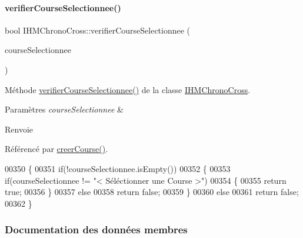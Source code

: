 \paragraph{\texorpdfstring{verifier\+Course\+Selectionnee()}{verifierCourseSelectionnee()}}
{\footnotesize\ttfamily bool I\+H\+M\+Chrono\+Cross\+::verifier\+Course\+Selectionnee (\begin{DoxyParamCaption}\item[{Q\+String}]{course\+Selectionnee }\end{DoxyParamCaption})\hspace{0.3cm}{\ttfamily [private]}}



Méthode \hyperlink{class_i_h_m_chrono_cross_afa7d1fb0245bb3e8bbffdf2687b02248}{verifier\+Course\+Selectionnee()} de la classe \hyperlink{class_i_h_m_chrono_cross}{I\+H\+M\+Chrono\+Cross}. 


\begin{DoxyParams}{Paramètres}
{\em course\+Selectionnee} & \\
\hline
\end{DoxyParams}
\begin{DoxyReturn}{Renvoie}

\end{DoxyReturn}


Référencé par \hyperlink{class_i_h_m_chrono_cross_a3fc01e539c59645e0655e56e440f4b83}{creer\+Course()}.


\begin{DoxyCode}
00350 \{
00351     \textcolor{keywordflow}{if}(!courseSelectionnee.isEmpty())
00352     \{
00353         \textcolor{keywordflow}{if}(courseSelectionnee != \textcolor{stringliteral}{"< Séléctionner une Course >"})
00354         \{
00355             \textcolor{keywordflow}{return} \textcolor{keyword}{true};
00356         \}
00357         \textcolor{keywordflow}{else}
00358             \textcolor{keywordflow}{return} \textcolor{keyword}{false};
00359     \}
00360     \textcolor{keywordflow}{else}
00361         \textcolor{keywordflow}{return} \textcolor{keyword}{false};
00362 \}
\end{DoxyCode}


\subsubsection{Documentation des données membres}
\mbox{\label{class_i_h_m_chrono_cross_a3ad2d6f9520ae7ed917fba070ed55d4c}} 
